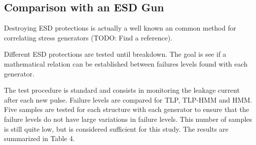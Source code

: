 

\subsection{Comparison with an ESD Gun}

Destroying ESD protections is actually a well known an common method for correlating stress generators (TODO: Find a reference).

Different ESD protections are tested until breakdown.
The goal is see if a mathematical relation can be established between failures levels found with each generator.

The test procedure is standard and consists in monitoring the leakage current after each new pulse.
Failure levels are compared for TLP, TLP-HMM and HMM.
Five samples are tested for each structure with each generator to ensure that the failure levels do not have large variations in failure levels. This number of samples is still quite low, but is considered sufficient for this study.
The results are summarized in Table 4.

